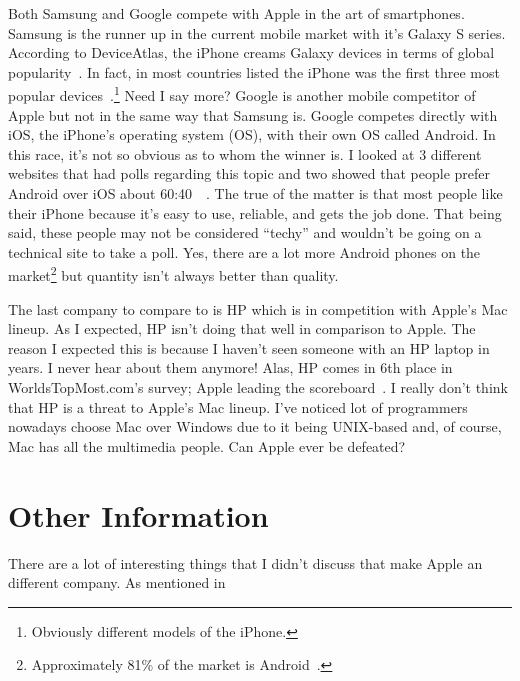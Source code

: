 \documentclass[12pt,a4paper,titlepage]{article}
\begin{document}
Both Samsung and Google compete with Apple in the art of smartphones. Samsung is
the runner up in the current mobile market with it's Galaxy S series. According
to DeviceAtlas, the iPhone creams Galaxy devices in terms of global
popularity~\cite{smartphones}. In fact, in most countries listed the iPhone was
the first three most popular devices~\cite{smartphones}.\footnote{Obviously
  different models of the iPhone.} Need I say more? Google is another mobile
competitor of Apple but not in the same way that Samsung is. Google competes
directly with iOS, the iPhone's operating system (OS), with their own OS called
Android. In this race, it's not so obvious as to whom the winner is. I looked at
3 different websites that had polls regarding this topic and two showed that
people prefer Android over iOS about 60:40~\cite{poll1}~\cite{poll2}. The true
of the matter is that most people like their iPhone because it's easy to use,
reliable, and gets the job done. That being said, these people may not be
considered ``techy'' and wouldn't be going on a technical site to take a
poll. Yes, there are a lot more Android phones on the
market\footnote{Approximately 81\% of the market is Android~\cite{verge}.} but
quantity isn't always better than quality.

The last company to compare to is HP which is in competition with Apple's Mac
lineup. As I expected, HP isn't doing that well in comparison to Apple. The
reason I expected this is because I haven't seen someone with an HP laptop in
years. I never hear about them anymore! Alas, HP comes in 6th place in
WorldsTopMost.com's survey; Apple leading the scoreboard~\cite{most}. I really
don't think that HP is a threat to Apple's Mac lineup. I've noticed lot of
programmers nowadays choose Mac over Windows due to it being UNIX-based and, of
course, Mac has all the multimedia people. Can Apple ever be defeated?

\newpage

\section{Other Information}
There are a lot of interesting things that I didn't discuss that make Apple an
different company. As mentioned in

\newpage
\end{document}
